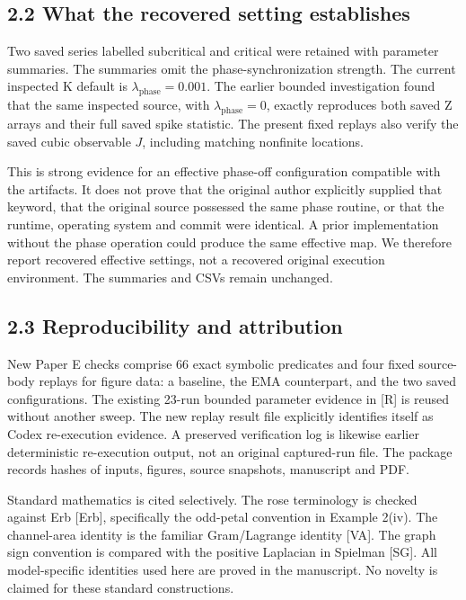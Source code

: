 \documentclass[
  11pt,
  a4paper,
]{article}
\begin{document}
\subsection{2.2 What the recovered setting establishes}\label{what-the-recovered-setting-establishes}

Two saved series labelled subcritical and critical were retained with parameter summaries. The summaries omit the phase-synchronization strength. The current inspected K default is \(\lambda_{\mathrm{phase}}=0.001\). The earlier bounded investigation found that the same inspected source, with \(\lambda_{\mathrm{phase}}=0\), exactly reproduces both saved Z arrays and their full saved spike statistic. The present fixed replays also verify the saved cubic observable \(J\), including matching nonfinite locations.

This is strong evidence for an effective phase-off configuration compatible with the artifacts. It does not prove that the original author explicitly supplied that keyword, that the original source possessed the same phase routine, or that the runtime, operating system and commit were identical. A prior implementation without the phase operation could produce the same effective map. We therefore report recovered effective settings, not a recovered original execution environment. The summaries and CSVs remain unchanged.

\subsection{2.3 Reproducibility and attribution}\label{reproducibility-and-attribution}

New Paper E checks comprise 66 exact symbolic predicates and four fixed source-body replays for figure data: a baseline, the EMA counterpart, and the two saved configurations. The existing 23-run bounded parameter evidence in {[}R{]} is reused without another sweep. The new replay result file explicitly identifies itself as Codex re-execution evidence. A preserved verification log is likewise earlier deterministic re-execution output, not an original captured-run file. The package records hashes of inputs, figures, source snapshots, manuscript and PDF.

Standard mathematics is cited selectively. The rose terminology is checked against Erb {[}Erb{]}, specifically the odd-petal convention in Example 2(iv). The channel-area identity is the familiar Gram/Lagrange identity {[}VA{]}. The graph sign convention is compared with the positive Laplacian in Spielman {[}SG{]}. All model-specific identities used here are proved in the manuscript. No novelty is claimed for these standard constructions.
\end{document}
